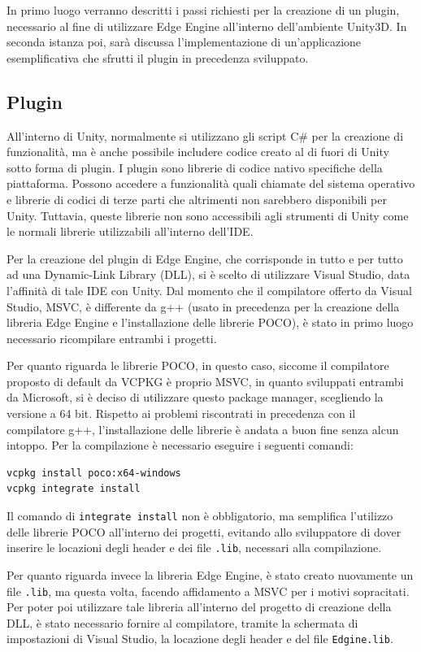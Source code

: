 In primo luogo verranno descritti i passi richiesti per la creazione di un plugin, necessario al fine di utilizzare Edge Engine all'interno dell'ambiente Unity3D. In seconda istanza poi, sarà discussa l'implementazione di un'applicazione esemplificativa che sfrutti il plugin in precedenza sviluppato.
\subsection{Plugin}\label{plugin}
All'interno di Unity, normalmente si utilizzano gli script C\# per la creazione di funzionalità, ma è anche possibile includere codice creato al di fuori di Unity sotto forma di plugin. I plugin sono librerie di codice nativo specifiche della piattaforma. Possono accedere a funzionalità quali chiamate del sistema operativo e librerie di codici di terze parti che altrimenti non sarebbero disponibili per Unity. Tuttavia, queste librerie non sono accessibili agli strumenti di Unity come le normali librerie utilizzabili all'interno dell'IDE.

Per la creazione del plugin di Edge Engine, che corrisponde in tutto e per tutto ad una Dynamic-Link Library (DLL), si è scelto di utilizzare Visual Studio, data l'affinità di tale IDE con Unity. Dal momento che il compilatore offerto da Visual Studio, MSVC, è differente da g++ (usato in precedenza per la creazione della libreria Edge Engine e l’installazione delle librerie POCO), è stato in primo luogo necessario ricompilare entrambi i progetti.

Per quanto riguarda le librerie POCO, in questo caso, siccome il compilatore proposto di default da VCPKG è proprio MSVC, in quanto sviluppati entrambi da Microsoft, si è deciso di utilizzare questo package manager, scegliendo la versione a 64 bit. Rispetto ai problemi riscontrati in precedenza con il compilatore g++, l’installazione delle librerie è andata a buon fine senza alcun intoppo. Per la compilazione è necessario eseguire i seguenti comandi:

\begin{verbatim}
vcpkg install poco:x64-windows
vcpkg integrate install
\end{verbatim}

Il comando di \texttt{integrate install} non è obbligatorio, ma semplifica l'utilizzo delle librerie POCO all'interno dei progetti, evitando allo sviluppatore di dover inserire le locazioni degli header e dei file \texttt{.lib}, necessari alla compilazione.

Per quanto riguarda invece la libreria Edge Engine, è stato creato nuovamente un file \texttt{.lib}, ma questa volta, facendo affidamento a MSVC per i motivi sopracitati. Per poter poi utilizzare tale libreria all'interno del progetto di creazione della DLL, è stato necessario fornire al compilatore, tramite la schermata di impostazioni di Visual Studio, la locazione degli header e del file \texttt{Edgine.lib}.

